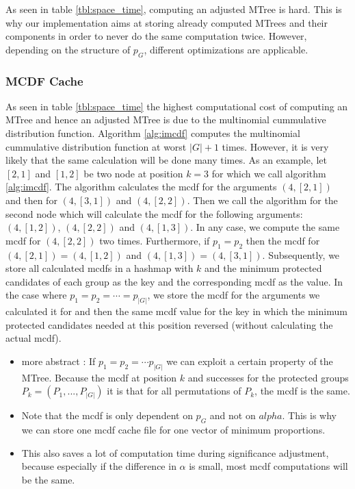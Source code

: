 As seen in table \ref{tbl:space_time}, computing an adjusted MTree is hard. This is why our implementation aims at storing already computed MTrees and their components in order to never do the same computation twice. However, depending on the structure of $p_G$, different optimizations are applicable.
\subsubsection{MCDF Cache}\label{subsubsec:mcdf-cache}
As seen in table \ref{tbl:space_time} the highest computational cost of computing an MTree and hence an adjusted MTree is due to the multinomial cummulative distribution function. Algorithm \ref{alg:imcdf} computes the multinomial cummulative distribution function at worst $|G|+1$ times. However, it is very likely that the same calculation will be done many times. As an example, let $[2,1]$ and $[1,2]$ be two node at position $k=3$ for which we call algorithm \ref{alg:imcdf}. The algorithm calculates the mcdf for the arguments $(4,[2,1])$ and then for $(4,[3,1])$ and $(4,[2,2])$. Then we call the algorithm for the second node which will calculate the mcdf for the following arguments: $(4,[1,2])$, $(4,[2,2])$ and $(4,[1,3])$. In any case, we compute the same mcdf for $(4,[2,2])$ two times. Furthermore, if $p_1 = p_2$ then the mcdf for $(4,[2,1]) = (4,[1,2])$ and  $(4,[1,3]) = (4,[3,1])$. Subsequently, we store all calculated mcdfs in a hashmap with $k$ and the minimum protected candidates of each group as the key and the corresponding mcdf as the value. In the case where $p_1 = p_2 = \cdots = p_{|G|}$, we store the mcdf for the arguments we calculated it for and then the same mcdf value for the key in which the minimum protected candidates needed at this position reversed (without calculating the actual mcdf).
\begin{itemize}
\item more abstract : If $p_1 = p_2 = \cdots p_{|G|}$ we can exploit a certain property of the MTree. Because the mcdf at position $k$ and successes for the protected groups $P_k = (P_1, ..., P_{|G|})$ it is that for all permutations of $P_k$, the mcdf is the same.
\item Note that the mcdf is only dependent on $p_G$ and not on $alpha$. This is why we can store one mcdf cache file for one vector of minimum proportions.
\item This also saves a lot of computation time during significance adjustment, because especially if the difference in $\alpha$ is small, most mcdf computations will be the same.

\end{itemize}
